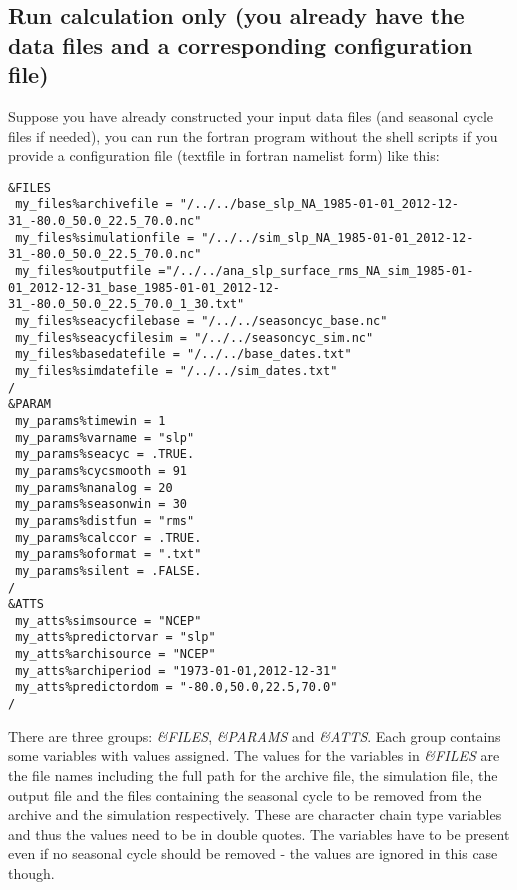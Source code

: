 \documentclass[11p,a4paper]{article}
\begin{document}
\subsection{Run calculation only (you already have the data files and a corresponding configuration file)}
Suppose you have already constructed your input data files (and seasonal cycle files if needed), you can run the fortran program without the shell scripts if you provide a configuration file (textfile in fortran namelist form) like this:
\begin{verbatim}
&FILES
 my_files%archivefile = "/../../base_slp_NA_1985-01-01_2012-12-31_-80.0_50.0_22.5_70.0.nc"
 my_files%simulationfile = "/../../sim_slp_NA_1985-01-01_2012-12-31_-80.0_50.0_22.5_70.0.nc"
 my_files%outputfile ="/../../ana_slp_surface_rms_NA_sim_1985-01-01_2012-12-31_base_1985-01-01_2012-12-31_-80.0_50.0_22.5_70.0_1_30.txt"
 my_files%seacycfilebase = "/../../seasoncyc_base.nc"
 my_files%seacycfilesim = "/../../seasoncyc_sim.nc"
 my_files%basedatefile = "/../../base_dates.txt"
 my_files%simdatefile = "/../../sim_dates.txt"
/
&PARAM
 my_params%timewin = 1
 my_params%varname = "slp"
 my_params%seacyc = .TRUE.
 my_params%cycsmooth = 91
 my_params%nanalog = 20
 my_params%seasonwin = 30
 my_params%distfun = "rms"
 my_params%calccor = .TRUE.
 my_params%oformat = ".txt"
 my_params%silent = .FALSE.
/
&ATTS
 my_atts%simsource = "NCEP"
 my_atts%predictorvar = "slp"
 my_atts%archisource = "NCEP"
 my_atts%archiperiod = "1973-01-01,2012-12-31"
 my_atts%predictordom = "-80.0,50.0,22.5,70.0"
/
\end{verbatim}
There are three groups: \textit{\&FILES}, \textit{\&PARAMS} and \textit{\&ATTS}. Each group contains some variables with values assigned. The values for the variables in \textit{\&FILES} are the file names including the full path for the archive file, the simulation file, the output file and the files containing the seasonal cycle to be removed from the archive and the  simulation respectively. These are character chain type variables and thus the values need to be in double quotes. The variables have to be present even if no seasonal cycle should be removed - the values are ignored in this case though.
\end{document}
